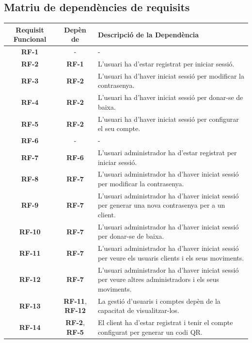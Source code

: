 \documentclass[a4paper,12pt,twoside]{ThesisStyle}
\begin{document}
\subsection{Matriu de dependències de requisits}
\label{Matriu de dependències de requisits}


\begin{table}[h!]
    \centering
    \begin{tabular}{|c|c|p{7cm}|}
    \hline
    \textbf{Requisit Funcional} & \textbf{Depèn de} & \textbf{Descripció de la Dependència} \\ \hline
    \textbf{RF-1} & - & - \\ \hline
    \textbf{RF-2} & \textbf{RF-1} & L'usuari ha d'estar registrat per iniciar sessió. \\ \hline
    \textbf{RF-3} & \textbf{RF-2} & L'usuari ha d'haver iniciat sessió per modificar la contrasenya. \\ \hline
    \textbf{RF-4} & \textbf{RF-2} & L'usuari ha d'haver iniciat sessió per donar-se de baixa. \\ \hline
    \textbf{RF-5} & \textbf{RF-2} & L'usuari ha d'haver iniciat sessió per configurar el seu compte. \\ \hline
    \textbf{RF-6} & - & - \\ \hline
    \textbf{RF-7} & \textbf{RF-6} & L'usuari administrador ha d'estar registrat per iniciar sessió. \\ \hline
    \textbf{RF-8} & \textbf{RF-7} & L'usuari administrador ha d'haver iniciat sessió per modificar la contrasenya. \\ \hline
    \textbf{RF-9} & \textbf{RF-7} & L'usuari administrador ha d'haver iniciat sessió per generar una nova contrasenya per a un client. \\ \hline
    \textbf{RF-10} & \textbf{RF-7} & L'usuari administrador ha d'haver iniciat sessió per donar-se de baixa. \\ \hline
    \textbf{RF-11} & \textbf{RF-7} & L'usuari administrador ha d'haver iniciat sessió per veure els usuaris clients i els seus moviments. \\ \hline
    \textbf{RF-12} & \textbf{RF-7} & L'usuari administrador ha d'haver iniciat sessió per veure altres administradors i els seus moviments. \\ \hline
    \textbf{RF-13} & \textbf{RF-11}, \textbf{RF-12} & La gestió d'usuaris i comptes depèn de la capacitat de visualitzar-los. \\ \hline
    \textbf{RF-14} & \textbf{RF-2}, \textbf{RF-5} & El client ha d'estar registrat i tenir el compte configurat per generar un codi QR. \\ \hline

\end{tabular}
\end{table}
\end{document}
